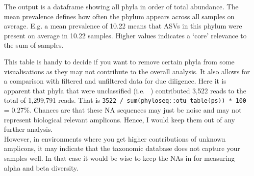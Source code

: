 \documentclass[
]{book}
\begin{document}
The output is a dataframe showing all phyla in order of total abundance. The mean prevalence defines how often the phylum appears across all samples on average. E.g. a mean prevalence of 10.22 means that ASVs in this phylum were present on average in 10.22 samples. Higher values indicates a `core' relevance to the sum of samples.

This table is handy to decide if you want to remove certain phyla from some visualisations as they may not contribute to the overall analysis. It also allows for a comparison with filtered and unfiltered data for due diligence. Here it is apparent that phyla that were unclassified (i.e.~ ) contributed 3,522 reads to the total of 1,299,791 reads. That is \texttt{3522\ /\ sum(phyloseq::otu\_table(ps))\ *\ 100} = 0.27\%. Chances are that these NA sequences may just be noise and may not represent biological relevant amplicons. Hence, I would keep them out of any further analysis.\\
However, in environments where you get higher contributions of unknown amplicons, it may indicate that the taxonomic database does not capture your samples well. In that case it would be wise to keep the NAs in for measuring alpha and beta diversity.
\end{document}
